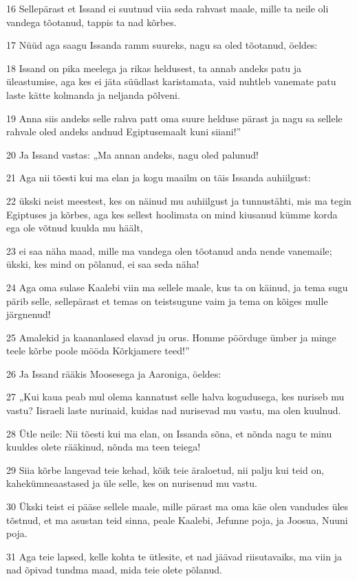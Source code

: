 \par 16 Sellepärast et Issand ei suutnud viia seda rahvast maale, mille ta neile oli vandega tõotanud, tappis ta nad kõrbes.
\par 17 Nüüd aga saagu Issanda ramm suureks, nagu sa oled tõotanud, öeldes:
\par 18 Issand on pika meelega ja rikas heldusest, ta annab andeks patu ja üleastumise, aga kes ei jäta süüdlast karistamata, vaid nuhtleb vanemate patu laste kätte kolmanda ja neljanda põlveni.
\par 19 Anna siis andeks selle rahva patt oma suure helduse pärast ja nagu sa sellele rahvale oled andeks andnud Egiptusemaalt kuni siiani!”
\par 20 Ja Issand vastas: „Ma annan andeks, nagu oled palunud!
\par 21 Aga nii tõesti kui ma elan ja kogu maailm on täis Issanda auhiilgust:
\par 22 ükski neist meestest, kes on näinud mu auhiilgust ja tunnustähti, mis ma tegin Egiptuses ja kõrbes, aga kes sellest hoolimata on mind kiusanud kümme korda ega ole võtnud kuulda mu häält,
\par 23 ei saa näha maad, mille ma vandega olen tõotanud anda nende vanemaile; ükski, kes mind on põlanud, ei saa seda näha!
\par 24 Aga oma sulase Kaalebi viin ma sellele maale, kus ta on käinud, ja tema sugu pärib selle, sellepärast et temas on teistsugune vaim ja tema on kõiges mulle järgnenud!
\par 25 Amalekid ja kaananlased elavad ju orus. Homme pöörduge ümber ja minge teele kõrbe poole mööda Kõrkjamere teed!”
\par 26 Ja Issand rääkis Moosesega ja Aaroniga, öeldes:
\par 27 „Kui kaua peab mul olema kannatust selle halva kogudusega, kes nuriseb mu vastu? Iisraeli laste nurinaid, kuidas nad nurisevad mu vastu, ma olen kuulnud.
\par 28 Ütle neile: Nii tõesti kui ma elan, on Issanda sõna, et nõnda nagu te minu kuuldes olete rääkinud, nõnda ma teen teiega!
\par 29 Siia kõrbe langevad teie kehad, kõik teie äraloetud, nii palju kui teid on, kahekümneaastased ja üle selle, kes on nurisenud mu vastu.
\par 30 Ükski teist ei pääse sellele maale, mille pärast ma oma käe olen vandudes üles tõstnud, et ma asustan teid sinna, peale Kaalebi, Jefunne poja, ja Joosua, Nuuni poja.
\par 31 Aga teie lapsed, kelle kohta te ütlesite, et nad jäävad riisutavaiks, ma viin ja nad õpivad tundma maad, mida teie olete põlanud.

